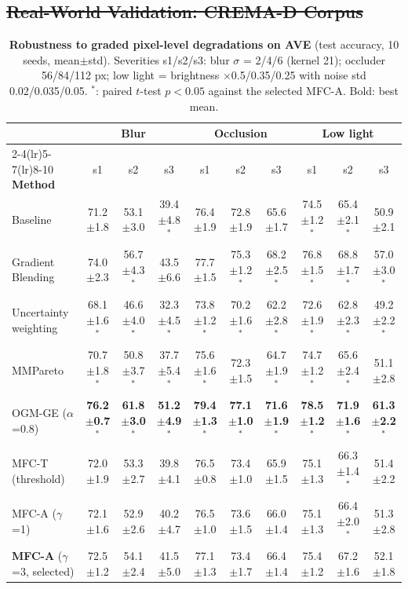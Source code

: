 \documentclass[fleqn,10pt]{wlscirep}
\newcommand{\pmm}{$\pm$} %
\providecommand{\DIFdel}[1]{{\protect\color{red}\sout{#1}}} %
\providecommand{\DIFaddbegin}{} %
\providecommand{\DIFaddend}{} %
\providecommand{\DIFdelbegin}{} %
\providecommand{\DIFdelend}{} %
\begin{document}
\DIFdelbegin \subsection{\DIFdel{Real-World Validation: CREMA-D Corpus}}
\addtocounter{subsection}{-1}%
\DIFdelend \DIFaddbegin \begin{table}[t]
\caption{\textbf{Robustness to graded pixel-level degradations on AVE} (test accuracy, 10 seeds, mean\pmm std). Severities s1/s2/s3: blur $\sigma$ = 2/4/6 (kernel 21); occluder 56/84/112 px; low light = brightness $\times$0.5/0.35/0.25 with noise std 0.02/0.035/0.05. $^{*}$: paired $t$-test $p<0.05$ against the selected MFC-A. Bold: best mean.}
\label{tab:severity}
\centering
\footnotesize
\setlength{\tabcolsep}{3pt}
\begin{tabular}{@{}lccccccccc@{}}
\toprule
& \multicolumn{3}{c}{\textbf{Blur}} & \multicolumn{3}{c}{\textbf{Occlusion}} & \multicolumn{3}{c}{\textbf{Low light}} \\
\cmidrule(lr){2-4}\cmidrule(lr){5-7}\cmidrule(lr){8-10}
\textbf{Method} & s1 & s2 & s3 & s1 & s2 & s3 & s1 & s2 & s3 \\ \midrule
Baseline & 71.2$\pm$1.8 & 53.1$\pm$3.0 & 39.4$\pm$4.8$^{*}$ & 76.4$\pm$1.9 & 72.8$\pm$1.9 & 65.6$\pm$1.7 & 74.5$\pm$1.2$^{*}$ & 65.4$\pm$2.1$^{*}$ & 50.9$\pm$2.1 \\
Gradient Blending & 74.0$\pm$2.3 & 56.7$\pm$4.3$^{*}$ & 43.5$\pm$6.6 & 77.7$\pm$1.5 & 75.3$\pm$1.2$^{*}$ & 68.2$\pm$2.5$^{*}$ & 76.8$\pm$1.5$^{*}$ & 68.8$\pm$1.7$^{*}$ & 57.0$\pm$3.0$^{*}$ \\
Uncertainty weighting & 68.1$\pm$1.6$^{*}$ & 46.6$\pm$4.0$^{*}$ & 32.3$\pm$4.5$^{*}$ & 73.8$\pm$1.2$^{*}$ & 70.2$\pm$1.6$^{*}$ & 62.2$\pm$2.8$^{*}$ & 72.6$\pm$1.9$^{*}$ & 62.8$\pm$2.3$^{*}$ & 49.2$\pm$2.2$^{*}$ \\
MMPareto & 70.7$\pm$1.8$^{*}$ & 50.8$\pm$3.7$^{*}$ & 37.7$\pm$5.4$^{*}$ & 75.6$\pm$1.6$^{*}$ & 72.3$\pm$1.5 & 64.7$\pm$1.9$^{*}$ & 74.7$\pm$1.2$^{*}$ & 65.6$\pm$2.4$^{*}$ & 51.1$\pm$2.8 \\
OGM-GE ($\alpha$=0.8) & \textbf{76.2$\pm$0.7$^{*}$} & \textbf{61.8$\pm$3.0$^{*}$} & \textbf{51.2$\pm$4.9$^{*}$} & \textbf{79.4$\pm$1.3$^{*}$} & \textbf{77.1$\pm$1.0$^{*}$} & \textbf{71.6$\pm$1.9$^{*}$} & \textbf{78.5$\pm$1.2$^{*}$} & \textbf{71.9$\pm$1.6$^{*}$} & \textbf{61.3$\pm$2.2$^{*}$} \\
MFC-T (threshold) & 72.0$\pm$1.9 & 53.3$\pm$2.7 & 39.8$\pm$4.1 & 76.5$\pm$0.8 & 73.4$\pm$1.0 & 65.9$\pm$1.5 & 75.1$\pm$1.3 & 66.3$\pm$1.4$^{*}$ & 51.4$\pm$2.2 \\
MFC-A ($\gamma$=1) & 72.1$\pm$1.6 & 52.9$\pm$2.6 & 40.2$\pm$4.7 & 76.5$\pm$1.0 & 73.6$\pm$1.5 & 66.0$\pm$1.4 & 75.1$\pm$1.3 & 66.4$\pm$2.0$^{*}$ & 51.3$\pm$2.8 \\
\textbf{MFC-A} ($\gamma$=3, selected) & 72.5$\pm$1.2 & 54.1$\pm$2.4 & 41.5$\pm$5.0 & 77.1$\pm$1.3 & 73.4$\pm$1.7 & 66.4$\pm$1.4 & 75.4$\pm$1.2 & 67.2$\pm$1.6 & 52.1$\pm$1.8 \\
\bottomrule
\end{tabular}
\end{table}
\DIFaddend 
\end{document}
